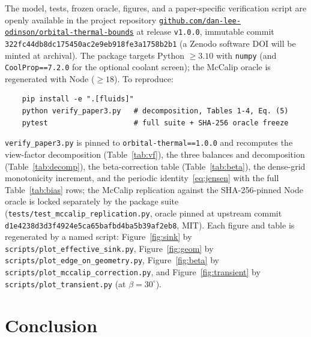 \documentclass[11pt]{article}
\theoremstyle{remark}
\begin{document}
The model, tests, frozen oracle, figures, and a paper-specific verification script
are openly available in the project repository
\href{https://github.com/dan-lee-odinson/orbital-thermal-bounds}{\texttt{github.com/dan-lee-odinson/orbital-thermal-bounds}}
at release \texttt{v1.0.0}, immutable commit
\texttt{322fc44db8dc175450ac2e9eb918fe3a1758b2b1} (a Zenodo software DOI will be
minted at archival). The package targets Python $\ge 3.10$ with \texttt{numpy}
(and \texttt{CoolProp==7.2.0} for the optional coolant screen); the McCalip oracle
is regenerated with Node ($\ge 18$). To reproduce:
\begin{verbatim}
    pip install -e ".[fluids]"
    python verify_paper3.py   # decomposition, Tables 1-4, Eq. (5)
    pytest                    # full suite + SHA-256 oracle freeze
\end{verbatim}
\texttt{verify\_paper3.py} is pinned to \texttt{orbital-thermal==1.0.0} and
recomputes the view-factor decomposition (Table~\ref{tab:vf}), the three balances
and decomposition (Table~\ref{tab:decomp}), the beta-correction table
(Table~\ref{tab:beta}), the dense-grid monotonicity increment, and the periodic
identity~\eqref{eq:jensen} with the full Table~\ref{tab:bias} rows; the McCalip
replication against the SHA-256-pinned Node oracle is locked separately by the
package suite (\texttt{tests/test\_mccalip\_replication.py}, oracle pinned at
upstream commit \texttt{d1e4238d3d3f4924e5ca65bafbd4ba5b39af2eb8}, MIT). Each
figure and table is regenerated by a named script: Figure~\ref{fig:sink} by
\texttt{scripts/plot\_effective\_sink.py}, Figure~\ref{fig:geom} by
\texttt{scripts/plot\_edge\_on\_geometry.py}, Figure~\ref{fig:beta} by
\texttt{scripts/plot\_mccalip\_correction.py}, and Figure~\ref{fig:transient}
by \texttt{scripts/plot\_transient.py} (at $\beta=30^{\circ}$).

\section{Conclusion}\label{sec:conclusion}
\end{document}
